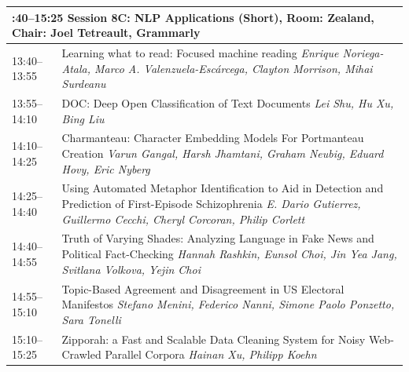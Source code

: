 \documentclass{book}
\renewcommand{\large}{\fontsize{36}{40}\selectfont}
\begin{document}
\begin{tabular}{p{3in}p{16in}}
  \multicolumn{2}{p{\textwidth}}{\bfseries\large 13:40--15:25 Session 8C: NLP Applications (Short), Room:  Zealand, Chair:  Joel Tetreault, Grammarly} \\\hline

    
    13:40--13:55
    &	Learning what to read: Focused machine reading \newline 
    {\itshape Enrique Noriega-Atala, Marco A. Valenzuela-Escárcega, Clayton Morrison, Mihai Surdeanu} \\
    
    13:55--14:10
    &	DOC: Deep Open Classification of Text Documents \newline 
    {\itshape Lei Shu, Hu Xu, Bing Liu} \\
    
    14:10--14:25
    &	Charmanteau: Character Embedding Models For Portmanteau Creation \newline 
    {\itshape Varun Gangal, Harsh Jhamtani, Graham Neubig, Eduard Hovy, Eric Nyberg} \\
    
    14:25--14:40
    &	Using Automated Metaphor Identification to Aid in Detection and Prediction of First-Episode Schizophrenia \newline 
    {\itshape E. Dario Gutierrez, Guillermo Cecchi, Cheryl Corcoran, Philip Corlett} \\
    
    14:40--14:55
    &	Truth of Varying Shades: Analyzing Language in Fake News and Political Fact-Checking \newline 
    {\itshape Hannah Rashkin, Eunsol Choi, Jin Yea Jang, Svitlana Volkova, Yejin Choi} \\
    
    14:55--15:10
    &	Topic-Based Agreement and Disagreement in US Electoral Manifestos \newline 
    {\itshape Stefano Menini, Federico Nanni, Simone Paolo Ponzetto, Sara Tonelli} \\
    
    15:10--15:25
    &	Zipporah: a Fast and Scalable Data Cleaning System for Noisy Web-Crawled Parallel Corpora \newline 
    {\itshape Hainan Xu, Philipp Koehn} \\
    
\end{tabular}
\end{document}
